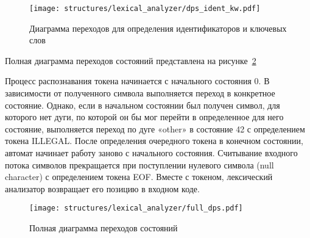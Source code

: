 \begin{figure}[ht]
	\centering
	\texttt{[image: structures/lexical\_analyzer/dps\_ident\_kw.pdf]}
	\caption{Диаграмма переходов для определения идентификаторов и ключевых слов}
	\label{f:dps_ident_kw}
\end{figure}

Полная диаграмма переходов состояний представлена на рисунке~\ref{f:full_dps}

Процесс распознавания токена начинается с начального состояния 0.
В зависимости от полученного символа выполняется переход в конкретное состояние.
Однако, если в начальном состоянии был получен символ, для которого нет дуги,
по которой он бы мог перейти в определенное для него состояние, выполняется переход по дуге «other» в состояние 42 с определением токена ILLEGAL.
После определения очередного токена в конечном состоянии, автомат начинает работу заново с начального состояния.
Считывание входного потока символов прекращается при поступлении нулевого символа (null character) с определением токена EOF.
Вместе с токеном, лексический анализатор возвращает его позицию в входном коде.


\clearpage

\begin{figure}[h!]
	\centering
	\texttt{[image: structures/lexical\_analyzer/full\_dps.pdf]}
	\caption{Полная диаграмма переходов состояний}
	\label{f:full_dps}
\end{figure}

\clearpage